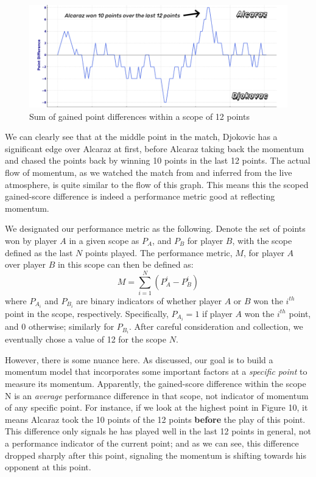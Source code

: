 \documentclass[12pt]{article}  %
\begin{document}
\begin{figure}[htbp]  %
	\centering  %
	\includegraphics[width=.6\textwidth]{difference.png} %
	\caption{Sum of gained point differences within a scope of 12 points} %
\end{figure}
\vspace{-0.2cm}

We can clearly see that at the middle point in the match, Djokovic has a significant edge over Alcaraz at first, before Alcaraz taking back the momentum and chased the points back by winning 10 points in the last 12 points. The actual flow of momentum, as we watched the match from \cite{7} and inferred from the live atmosphere, is quite similar to the flow of this graph. This means this the scoped gained-score difference is indeed a performance metric good at reflecting momentum.

We designated our performance metric as the following. Denote the set of points won by player \( A \) in a given scope as \( P_A \), and \( P_B \) for player \( B \), with the scope defined as the last \( N \) points played. The performance metric, \( M \), for player \( A \) over player \( B \) in this scope can then be defined as:
\[
M=\sum_{i=1}^{N}(P_{A}^i-P_{B}^i)
\]
where \( P_{A_i} \) and \( P_{B_i} \) are binary indicators of whether player \( A \) or \( B \) won the \( i^{th} \) point in the scope, respectively. Specifically, \( P_{A_i} = 1 \) if player \( A \) won the \( i^{th} \) point, and 0 otherwise; similarly for \( P_{B_i} \). After careful consideration and collection, we eventually chose a value of 12 for the scope $N$.

However, there is some nuance here. As discussed, our goal is to build a momentum model that incorporates some important factors at a \textit{specific point} to measure its momentum. Apparently, the gained-score difference within the scope N is an \textit{average} performance difference in that scope, not indicator of momentum of any specific point. For instance, if we look at the highest point in Figure 10, it means Alcaraz took the 10 points of the 12 points \textbf{before} the play of this point. This difference only signals he has played well in the last 12 points in general, not a performance indicator of the current point; and as we can see, this difference dropped sharply after this point, signaling the momentum is shifting towards his opponent at this point.
\end{document}
